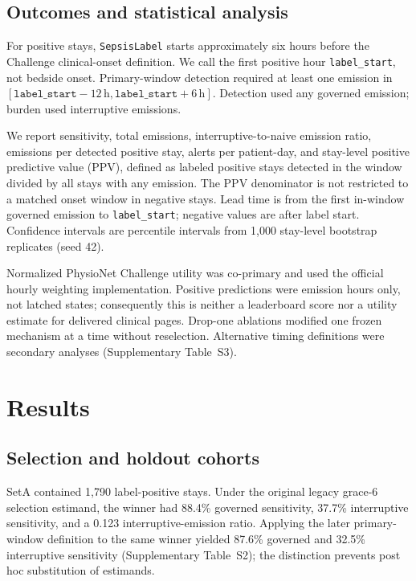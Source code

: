 \documentclass[11pt]{article}
\begin{document}
\subsection{Outcomes and statistical analysis}
For positive stays, \texttt{SepsisLabel} starts approximately six hours before
the Challenge clinical-onset definition.\citep{reyna2020ccm} We call the first
positive hour \texttt{label\_start}, not bedside onset. Primary-window detection
required at least one emission in
$[\texttt{label\_start}-12\,\mathrm{h},\texttt{label\_start}+6\,\mathrm{h}]$.
Detection used any governed emission; burden used interruptive emissions.

We report sensitivity, total emissions, interruptive-to-naive emission ratio,
emissions per detected positive stay, alerts per patient-day, and stay-level
positive predictive value (PPV), defined as labeled positive stays detected in
the window divided by all stays with any emission. The PPV denominator is not
restricted to a matched onset window in negative stays. Lead time is from the
first in-window governed emission to \texttt{label\_start}; negative values are
after label start. Confidence intervals are percentile intervals from 1,000
stay-level bootstrap replicates (seed 42).

Normalized PhysioNet Challenge utility was co-primary and used the official
hourly weighting implementation. Positive predictions were emission hours only,
not latched states; consequently this is neither a leaderboard score nor a
utility estimate for delivered clinical pages. Drop-one ablations modified one
frozen mechanism at a time without reselection. Alternative timing definitions
were secondary analyses (Supplementary Table~S3).

\section{Results}
\label{sec:results}
\subsection{Selection and holdout cohorts}
SetA contained 1,790 label-positive stays. Under the original legacy grace-6
selection estimand, the winner had 88.4\% governed sensitivity, 37.7\%
interruptive sensitivity, and a 0.123 interruptive-emission ratio. Applying the
later primary-window definition to the same winner yielded 87.6\% governed and
32.5\% interruptive sensitivity (Supplementary Table~S2); the distinction
prevents post hoc substitution of estimands.
\end{document}
